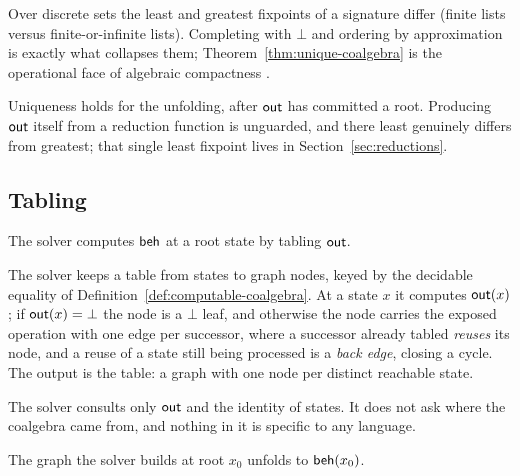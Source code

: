 \begin{remark}\label{rem:compact}
  Over discrete sets the least and greatest fixpoints of a signature differ (finite lists versus finite-or-infinite lists). Completing with $\bot$ and ordering by approximation is exactly what collapses them; Theorem~\ref{thm:unique-coalgebra} is the operational face of algebraic compactness \cite{smyth1982-recursive-domain-equations, freyd1991-algebraically-complete-categories}.
\end{remark}

\begin{remark}\label{rem:leastessential}
  Uniqueness holds for the unfolding, after $\mathsf{out}$ has committed a root. Producing $\mathsf{out}$
  itself from a reduction function is unguarded, and there least genuinely differs from greatest; that single least fixpoint lives in Section~\ref{sec:reductions}.
\end{remark}

\subsection{Tabling}\label{sec:tabling}

The solver computes $\mathsf{beh}$ at a root state by tabling $\mathsf{out}$.

\begin{definition}\label{def:solver}
  The solver keeps a table from states to graph nodes, keyed by the decidable equality of Definition~\ref{def:computable-coalgebra}. At a state $x$ it computes $\mathsf{out}(x)$;
  if $\mathsf{out}(x) = \bot$ the node is a $\bot$ leaf, and otherwise the node carries the exposed operation with one edge per successor, where a successor already tabled \emph{reuses} its node, and a reuse of a state still being processed is a \emph{back edge}, closing a cycle.
  The output is the table: a graph with one node per distinct reachable state.
\end{definition}

The solver consults only $\mathsf{out}$ and the identity of states. It does not ask where the coalgebra came from, and nothing in it is specific to any language.

\begin{theorem}[Soundness]\label{thm:correctness}
  The graph the solver builds at root $x_0$ unfolds to $\mathsf{beh}(x_0)$.
\end{theorem}

